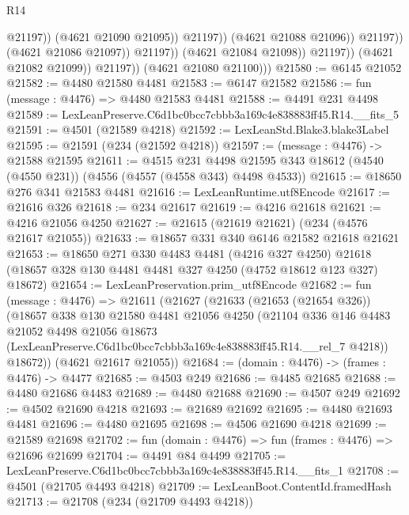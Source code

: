 \begin{lexlean}{R14}
\begin{coremodule}
                                          @21197))
                                      (@4621 @21090 @21095))
                                    @21197))
                                (@4621 @21088 @21096))
                              @21197))
                          (@4621 @21086 @21097))
                        @21197))
                    (@4621 @21084 @21098))
                  @21197))
              (@4621 @21082 @21099))
            @21197))
        (@4621 @21080 @21100)))
@21580 := @6145 @21052
@21582 := @4480 @21580 @4481
@21583 := @6147 @21582
@21586 := fun (message : @4476) => @4480 @21583 @4481
@21588 := @4491 @231 @4498
@21589 := LexLeanPreserve.C6d1bc0bcc7cbbb3a169c4e838883ff45.R14.__fits_5
@21591 := @4501 (@21589 @4218)
@21592 := LexLeanStd.Blake3.blake3Label
@21595 := @21591 (@234 (@21592 @4218))
@21597 := (message : @4476) -> @21588 @21595
@21611 := @4515
    @231
    @4498
    @21595
    @343
    @18612
    (@4540 (@4550 @231))
    (@4556 (@4557 (@4558 @343) @4498 @4533))
@21615 := @18650 @276 @341 @21583 @4481
@21616 := LexLeanRuntime.utf8Encode
@21617 := @21616 @326
@21618 := @234 @21617
@21619 := @4216 @21618
@21621 := @4216 @21056 @4250
@21627 := @21615 (@21619 @21621) (@234 (@4576 @21617 @21055))
@21633 := @18657 @331 @340 @6146 @21582 @21618 @21621
@21653 := @18650
    @271
    @330
    @4483
    @4481
    (@4216 @327 @4250)
    @21618
    (@18657 @328 @130 @4481 @4481 @327 @4250 (@4752 @18612 @123 @327) @18672)
@21654 := LexLeanPreservation.prim_utf8Encode
@21682 := fun (message : @4476) =>
  @21611
    (@21627
      (@21633
        (@21653 (@21654 @326))
        (@18657
          @338
          @130
          @21580
          @4481
          @21056
          @4250
          (@21104
            @336
            @146
            @4483
            @21052
            @4498
            @21056
            @18673
            (LexLeanPreserve.C6d1bc0bcc7cbbb3a169c4e838883ff45.R14.__rel_7 @4218))
          @18672))
      (@4621 @21617 @21055))
@21684 := (domain : @4476) -> (frames : @4476) -> @4477
@21685 := @4503 @249
@21686 := @4485 @21685
@21688 := @4480 @21686 @4483
@21689 := @4480 @21688
@21690 := @4507 @249
@21692 := @4502 @21690 @4218
@21693 := @21689 @21692
@21695 := @4480 @21693 @4481
@21696 := @4480 @21695
@21698 := @4506 @21690 @4218
@21699 := @21589 @21698
@21702 := fun (domain : @4476) => fun (frames : @4476) => @21696 @21699
@21704 := @4491 @84 @4499
@21705 := LexLeanPreserve.C6d1bc0bcc7cbbb3a169c4e838883ff45.R14.__fits_1
@21708 := @4501 (@21705 @4493 @4218)
@21709 := LexLeanBoot.ContentId.framedHash
@21713 := @21708 (@234 (@21709 @4493 @4218))

\end{coremodule}
\end{lexlean}
